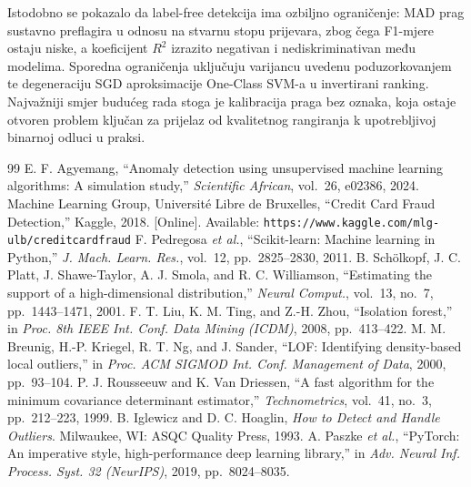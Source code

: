 \documentclass[letterpaper, 10pt, conference]{ieeeconf}
\begin{document}
Istodobno se pokazalo da label-free detekcija ima ozbiljno ograničenje: MAD prag sustavno preflagira u odnosu na stvarnu stopu prijevara, zbog čega F1-mjere ostaju niske, a koeficijent $R^2$ izrazito negativan i nediskriminativan među modelima. Sporedna ograničenja uključuju varijancu uvedenu poduzorkovanjem te degeneraciju SGD aproksimacije One-Class SVM-a u invertirani ranking. Najvažniji smjer budućeg rada stoga je kalibracija praga bez oznaka, koja ostaje otvoren problem ključan za prijelaz od kvalitetnog rangiranja k upotrebljivoj binarnoj odluci u praksi.

\begin{thebibliography}{99}
 E. F. Agyemang, ``Anomaly detection using unsupervised machine learning algorithms: A simulation study,'' \emph{Scientific African}, vol.~26, e02386, 2024.
 Machine Learning Group, Université Libre de Bruxelles, ``Credit Card Fraud Detection,'' Kaggle, 2018. [Online]. Available: \texttt{https://www.kaggle.com/mlg-ulb/creditcardfraud}
 F. Pedregosa \emph{et al.}, ``Scikit-learn: Machine learning in Python,'' \emph{J. Mach. Learn. Res.}, vol.~12, pp.~2825--2830, 2011.
 B. Schölkopf, J. C. Platt, J. Shawe-Taylor, A. J. Smola, and R. C. Williamson, ``Estimating the support of a high-dimensional distribution,'' \emph{Neural Comput.}, vol.~13, no.~7, pp.~1443--1471, 2001.
 F. T. Liu, K. M. Ting, and Z.-H. Zhou, ``Isolation forest,'' in \emph{Proc. 8th IEEE Int. Conf. Data Mining (ICDM)}, 2008, pp.~413--422.
 M. M. Breunig, H.-P. Kriegel, R. T. Ng, and J. Sander, ``LOF: Identifying density-based local outliers,'' in \emph{Proc. ACM SIGMOD Int. Conf. Management of Data}, 2000, pp.~93--104.
 P. J. Rousseeuw and K. Van Driessen, ``A fast algorithm for the minimum covariance determinant estimator,'' \emph{Technometrics}, vol.~41, no.~3, pp.~212--223, 1999.
 B. Iglewicz and D. C. Hoaglin, \emph{How to Detect and Handle Outliers}. Milwaukee, WI: ASQC Quality Press, 1993.
 A. Paszke \emph{et al.}, ``PyTorch: An imperative style, high-performance deep learning library,'' in \emph{Adv. Neural Inf. Process. Syst. 32 (NeurIPS)}, 2019, pp.~8024--8035.
\end{thebibliography}
\end{document}
